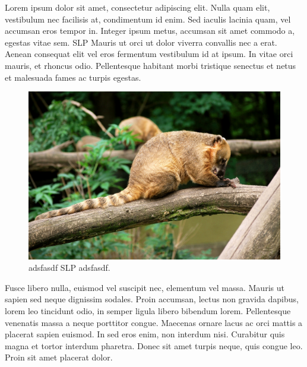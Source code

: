 \documentclass[a4paper,9pt]{scrartcl}
\begin{document}
Lorem ipsum dolor sit amet, consectetur adipiscing elit. Nulla quam elit,
vestibulum nec facilisis at, condimentum id enim. Sed iaculis lacinia quam, vel
accumsan eros tempor in. Integer ipsum metus, accumsan sit amet commodo a,
egestas vitae sem. \Gls{SLP} Mauris ut orci ut dolor viverra convallis nec a
erat. Aenean consequat elit vel eros fermentum vestibulum id at ipsum. In vitae
orci mauris, et rhoncus odio. Pellentesque habitant morbi tristique senectus et
netus et malesuada fames ac turpis egestas.

\begin{figure}[h]
    \centering
    \includegraphics*[width=\linewidth, keepaspectratio]{YourImage.jpg} 
    \caption{adsfasdf \gls{SLP} adsfasdf.}
\end{figure}

Fusce libero nulla, euismod vel suscipit nec, elementum vel massa. Mauris ut
sapien sed neque dignissim sodales. Proin accumsan, lectus non gravida dapibus,
lorem leo tincidunt odio, in semper ligula libero bibendum lorem. Pellentesque
venenatis massa a neque porttitor congue. Maecenas ornare lacus ac orci mattis
a placerat sapien euismod. In sed eros enim, non interdum nisi. Curabitur quis
magna et tortor interdum pharetra. Donec sit amet turpis neque, quis congue
leo. Proin sit amet placerat dolor.
\end{document}
